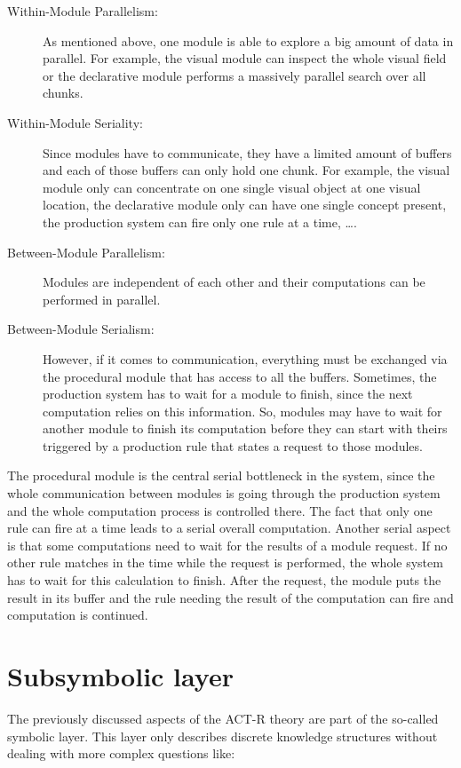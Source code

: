 \begin{description}
 \item[Within-Module Parallelism:] As mentioned above, one module is able to explore a big amount of data in parallel. For example, the visual module can inspect the whole visual field or the declarative module performs a massively parallel search over all chunks.
 \item[Within-Module Seriality:] Since modules have to communicate, they have a limited amount of buffers and each of those buffers can only hold one chunk. For example, the visual module only can concentrate on one single visual object at one visual location, the declarative module only can have one single concept present, the production system can fire only one rule at a time, \dots. 
 \item[Between-Module Parallelism:] Modules are independent of each other and their computations can be performed in parallel.
 \item[Between-Module Serialism:] However, if it comes to communication, everything must be exchanged via the procedural module that has access to all the buffers. Sometimes, the production system has to wait for a module to finish, since the next computation relies on this information. So, modules may have to wait for another module to finish its computation before they can start with theirs triggered by a production rule that states a request to those modules.
\end{description}

The procedural module is the central serial bottleneck in the system, since the whole communication between modules is going through the production system and the whole computation process is controlled there. The fact that only one rule can fire at a time leads to a serial overall computation. Another serial aspect is that some computations need to wait for the results of a module request. If no other rule matches in the time while the request is performed, the whole system has to wait for this calculation to finish. After the request, the module puts the result in its buffer and the rule needing the result of the computation can fire and computation is continued.

\section{Subsymbolic layer}

The previously discussed aspects of the ACT-R theory are part of the so-called symbolic layer. This layer only describes discrete knowledge structures without dealing with more complex questions like: 

